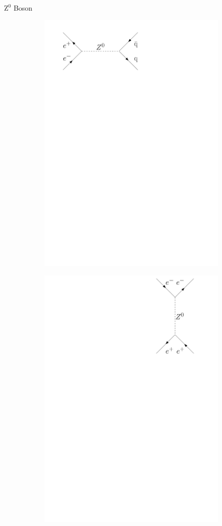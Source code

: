 \documentclass[11pt,xcolor=dvipsnames,professionalfonts]{beamer}
\begin{document}
\begin{frame}{$\mathrm{Z}^0$ Boson}
\begin{figure}[htb]
\begin{subfigure}{.28\textwidth}
			\centering
			\includegraphics[width=.8\textwidth]{./figures/theory/feynman/qq}
		\end{subfigure}
		\begin{subfigure}{.28\textwidth}
			\centering
			\includegraphics[width=.8\textwidth]{./figures/theory/feynman/ee_t}
		\end{subfigure}
	\end{figure}
\end{frame}
\end{document}
